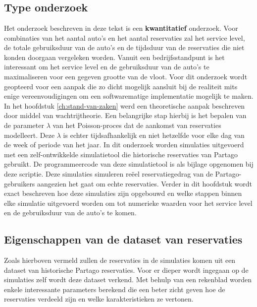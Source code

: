 
\chapter{}
\label{ch:methodologie}

\section{Type onderzoek}
Het onderzoek beschreven in deze tekst is een \textbf{kwantitatief} onderzoek. Voor combinaties van het aantal auto's en het aantal reservaties zal het service level, de totale gebruiksduur van de auto's en de tijdsduur van de reservaties die niet konden doorgaan vergeleken worden. Vanuit een bedrijfsstandpunt is het interessant om het service level en de gebruiksduur van de auto's te maximaliseren voor een gegeven grootte van de vloot. Voor dit onderzoek wordt geopteerd voor een aanpak die zo dicht mogelijk aansluit bij de realiteit mits enige vereenvoudigingen om een softwarematige implementatie mogelijk te maken. In het hoofdstuk \ref{ch:stand-van-zaken} werd een theoretische aanpak beschreven door middel van wachtrijtheorie. Een belangrijke stap hierbij is het bepalen van de parameter $\lambda$ van het Poisson-proces dat de aankomst van reservaties modelleert. Deze $\lambda$ is echter tijdsafhankelijk en niet hetzelfde voor elke dag van de week of periode van het jaar. In dit onderzoek worden simulaties uitgevoerd met een zelf-ontwikkelde simulatietool die historische reservaties van Partago gebruikt. De programmeercode van deze simulatietool is als bijlage opgenomen bij deze scriptie. Deze simulaties simuleren reëel reservatiegedrag van de Partago-gebruikers aangezien het gaat om echte reservaties. Verder in dit hoofdstuk wordt exact beschreven hoe deze simulaties zijn opgebouwd en welke stappen binnen elke simulatie uitgevoerd worden om tot numerieke waarden voor het service level en de gebruiksduur van de auto's te komen. 

\section{Eigenschappen van de dataset van reservaties} \label{eigenschappen-dataset}
Zoals hierboven vermeld zullen de reservaties in de simulaties komen uit een dataset van historische Partago reservaties. Voor er dieper wordt ingegaan op de simulaties zelf wordt deze dataset verkend. Met behulp van een rekenblad worden enkele interessante parameters berekend die een beter zicht geven hoe de reservaties verdeeld zijn en welke karakteristieken ze vertonen. 
